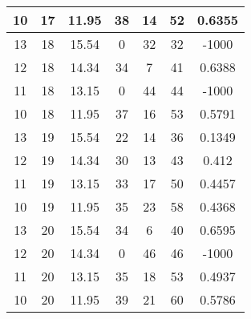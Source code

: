 \documentclass[letterpaper, 12pt]{article}
\begin{document}
\begin{longtable}{|c|c|c|c|c|c|c|}
10 & 17 & 11.95 & 38 & 14 & 52 & 0.6355 \\
\hline
13 & 18 & 15.54 & 0 & 32 & 32 & -1000 \\
\hline
12 & 18 & 14.34 & 34 & 7 & 41 & 0.6388 \\
\hline
11 & 18 & 13.15 & 0 & 44 & 44 & -1000 \\
\hline
10 & 18 & 11.95 & 37 & 16 & 53 & 0.5791 \\
\hline
13 & 19 & 15.54 & 22 & 14 & 36 & 0.1349 \\
\hline
12 & 19 & 14.34 & 30 & 13 & 43 & 0.412 \\
\hline
11 & 19 & 13.15 & 33 & 17 & 50 & 0.4457 \\
\hline
10 & 19 & 11.95 & 35 & 23 & 58 & 0.4368 \\
\hline
13 & 20 & 15.54 & 34 & 6 & 40 & 0.6595 \\
\hline
12 & 20 & 14.34 & 0 & 46 & 46 & -1000 \\
\hline
11 & 20 & 13.15 & 35 & 18 & 53 & 0.4937 \\
\hline
10 & 20 & 11.95 & 39 & 21 & 60 & 0.5786 \\
\hline
\end{longtable}
\end{document}
